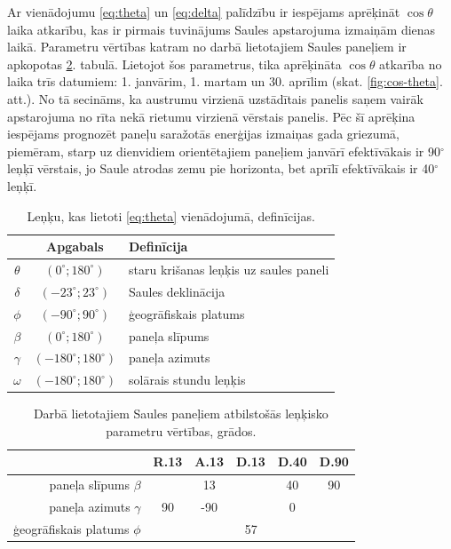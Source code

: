Ar vienādojumu \ref{eq:theta} un \ref{eq:delta} palīdzību ir iespējams aprēķināt $\cos{\theta}$ laika atkarību, kas ir pirmais tuvinājums Saules apstarojuma izmaiņām dienas laikā.
Parametru vērtības katram no darbā lietotajiem Saules paneļiem ir apkopotas \ref{tab:param}. tabulā.
Lietojot šos parametrus, tika aprēķināta $\cos{\theta}$ atkarība no laika trīs datumiem: 1. janvārim, 1. martam un 30. aprīlim (skat. \ref{fig:cos-theta}. att.). No tā secināms, ka austrumu virzienā uzstādītais panelis saņem vairāk apstarojuma no rīta nekā rietumu virzienā vērstais panelis. Pēc šī aprēķina iespējams prognozēt paneļu saražotās enerģijas izmaiņas gada griezumā, piemēram, starp uz dienvidiem orientētajiem paneļiem janvārī efektīvākais ir 90$^\circ$ leņķī vērstais, jo Saule atrodas zemu pie horizonta, bet aprīlī efektīvākais ir 40$^\circ$ leņķī.

\begin{table}[h!]
\caption{Leņķu, kas lietoti \ref{eq:theta} vienādojumā, definīcijas.}
\begin{center}
\begin{tabular}{|c|c|l|}\hline
	         &         Apgabals         & Definīcija\\ \hline
	$\theta$ &  $(0^\circ;180^\circ)$   & staru krišanas leņķis uz saules paneli\\ \hline
	$\delta$ &  $(-23^\circ;23^\circ)$  & Saules deklinācija\\ \hline
	 $\phi$  &  $(-90^\circ;90^\circ)$  & ģeogrāfiskais platums\\ \hline
	$\beta$  &  $(0^\circ;180^\circ)$   & paneļa slīpums \\ \hline
	$\gamma$ & $(-180^\circ;180^\circ)$ & paneļa azimuts \\ \hline
	$\omega$ & $(-180^\circ;180^\circ)$ & solārais stundu leņķis\\ \hline
\end{tabular}
\end{center}
\label{tab:theta}
\end{table}

\begin{table}[h!]
	\caption{Darbā lietotajiem Saules paneļiem atbilstošās leņķisko parametru vērtības, grādos.}
	\begin{center}
		\begin{tabular}{|r|c|c|c|c|c|}
			\hline
			         & R.13 & A.13 &   D.13   & D.40 & D.90 \\ \hline
			paneļa slīpums $\beta$  & \multicolumn{3}{c|}{13} &  40  &  90  \\ \hline
			paneļa azimuts $\gamma$ &  90  & -90  & \multicolumn{3}{c|}{0}  \\ \hline
			ģeogrāfiskais platums $\phi$  &        \multicolumn{5}{c|}{57}        \\ \hline
		\end{tabular}
	\end{center}
	\label{tab:param}
\end{table}


